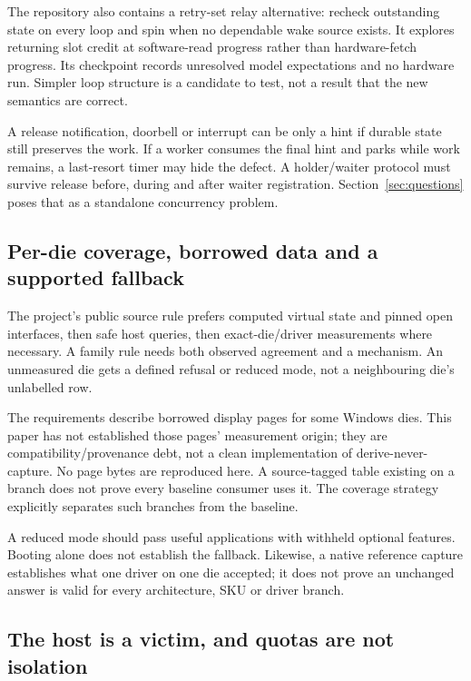 \doc The repository also contains a retry-set relay alternative: recheck outstanding state
on every loop and spin when no dependable wake source exists. It explores returning slot
credit at software-read progress rather than hardware-fetch progress. Its checkpoint records
unresolved model expectations and no hardware run. Simpler loop structure is a candidate to
test, not a result that the new semantics are correct.

A release notification, doorbell or interrupt can be only a hint if durable state still
preserves the work. If a worker consumes the final hint and parks while work remains, a
last-resort timer may hide the defect. A holder/waiter protocol must survive release before,
during and after waiter registration. Section~\ref{sec:questions} poses that as a standalone
concurrency problem.

\subsection{Per-die coverage, borrowed data and a supported fallback}

\doc The project's public source rule prefers computed virtual state and pinned open
interfaces, then safe host queries, then exact-die/driver measurements where necessary.
A family rule needs both observed agreement and a mechanism. An unmeasured die gets a defined
refusal or reduced mode, not a neighbouring die's unlabelled row.


\doc The requirements describe borrowed display pages for some Windows dies. This paper has
not established those pages' measurement origin; they are compatibility/provenance debt,
not a clean implementation of derive-never-capture. No page bytes are reproduced here.
A source-tagged table existing on a branch does not prove every baseline consumer uses it.
The coverage strategy explicitly separates such branches from the baseline.

\inferred A reduced mode should pass useful applications with withheld optional features.
Booting alone does not establish the fallback. Likewise, a native reference capture establishes
what one driver on one die accepted; it does not prove an unchanged answer is valid for every
architecture, SKU or driver branch.

\subsection{The host is a victim, and quotas are not isolation}


